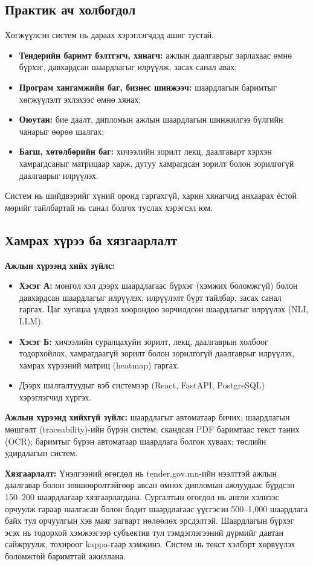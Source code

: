 \subsection*{Практик ач холбогдол}
Хөгжүүлсэн систем нь дараах хэрэглэгчдэд ашиг тустай.
\begin{itemize}[nosep]
    \item \textbf{Тендерийн баримт бэлтгэгч, хянагч:} ажлын даалгаврыг зарлахаас өмнө бүрхэг, давхардсан шаардлагыг илрүүлж, засах санал авах;
    \item \textbf{Програм хангамжийн баг, бизнес шинжээч:} шаардлагын баримтыг хөгжүүлэлт эхлэхээс өмнө хянах;
    \item \textbf{Оюутан:} бие даалт, дипломын ажлын шаардлагын шинжилгээ бүлгийн чанарыг өөрөө шалгах;
    \item \textbf{Багш, хөтөлбөрийн баг:} хичээлийн зорилт лекц, даалгаварт хэрхэн хамрагдсаныг матрицаар харж, дутуу хамрагдсан зорилт болон зорилгогүй даалгаврыг илрүүлэх.
\end{itemize}
Систем нь шийдвэрийг хүний оронд гаргахгүй, харин хянагчид анхаарах ёстой мөрийг тайлбартай нь санал болгох туслах хэрэгсэл юм.

\subsection*{Хамрах хүрээ ба хязгаарлалт}
\textbf{Ажлын хүрээнд хийх зүйлс:}
\begin{itemize}[nosep]
    \item \textbf{Хэсэг А:} монгол хэл дээрх шаардлагаас бүрхэг (хэмжих боломжгүй) болон давхардсан шаардлагыг илрүүлэх, илрүүлэлт бүрт тайлбар, засах санал гаргах. Цаг хугацаа үлдвэл хоорондоо зөрчилдсөн шаардлагыг илрүүлэх (NLI, LLM).
    \item \textbf{Хэсэг Б:} хичээлийн суралцахуйн зорилт, лекц, даалгаврын холбоог тодорхойлох, хамрагдаагүй зорилт болон зорилгогүй даалгаврыг илрүүлэх, хамрах хүрээний матриц (heatmap) гаргах.
    \item Дээрх шалгалтуудыг вэб системээр (React, FastAPI, PostgreSQL) хэрэглэгчид хүргэх.
\end{itemize}

\textbf{Ажлын хүрээнд хийхгүй зүйлс:} шаардлагыг автоматаар бичих; шаардлагын мөшгөлт (traceability)-ийн бүрэн систем; скандсан PDF баримтаас текст таних (OCR); баримтыг бүрэн автоматаар шаардлага болгон хуваах; төслийн удирдлагын систем.

\textbf{Хязгаарлалт:} Үнэлгээний өгөгдөл нь tender.gov.mn-ийн нээлттэй ажлын даалгавар болон зөвшөөрөлтэйгөөр авсан өмнөх дипломын ажлуудаас бүрдсэн 150--200 шаардлагаар хязгаарлагдана. Сургалтын өгөгдөл нь англи хэлнээс орчуулж гараар шалгасан болон бодит шаардлагаас үүсгэсэн 500--1,000 шаардлага байх тул орчуулгын хэв маяг загварт нөлөөлөх эрсдэлтэй. Шаардлагын бүрхэг эсэх нь тодорхой хэмжээгээр субъектив тул тэмдэглэгээний дүрмийг давтан сайжруулж, тохироог kappa-гаар хэмжинэ. Систем нь текст хэлбэрт хөрвүүлэх боломжтой баримттай ажиллана.


